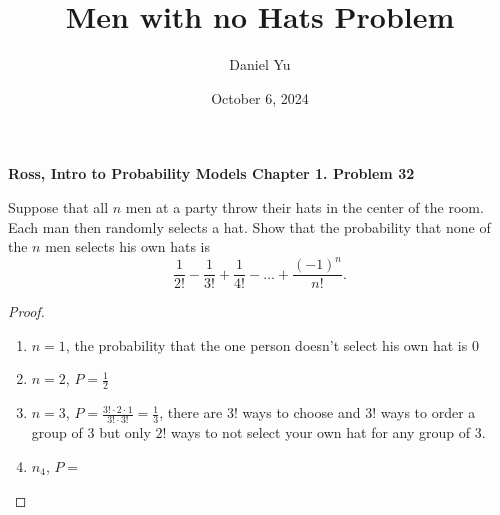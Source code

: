 \documentclass[a4paper]{article}
\title{\Huge{Men with no Hats Problem}}
\author{\huge{Daniel Yu}}
\date{October 6, 2024}
\begin{document}
\maketitle
\newpage%
\pagebreak
\textbf{Ross, Intro to Probability Models Chapter 1. Problem 32}
\begin{theorem}
  Suppose that all $n$ men at a party throw their hats in the center of the room. Each man then randomly selects a hat. Show that the probability that none of the $n$ men selects his own hats is 
   \[
  \frac{1}{2!} - \frac{1}{3!} + \frac{1}{4!} - \ldots + \frac{(-1)^{n}}{n!}
  .\]  
\end{theorem}
\begin{proof}
  \begin{enumerate}
    \item $n=1$, the probability that the one person doesn't select his own hat is  $0$
    \item  $n=2$,  $P=\frac{1}{2}$ 
    \item $n=3$,  $P=\frac{3! \cdot 2 \cdot 1}{3! \cdot 3!} = \frac{1}{3} $, there are $3!$ ways to choose and  $3!$ ways to order a group of $3$ but only $2!$ ways to not select your own hat for any group of 3. 
    \item $n_4$, $P=\frac{}{}$
  \end{enumerate}
\end{proof}
\end{document}
